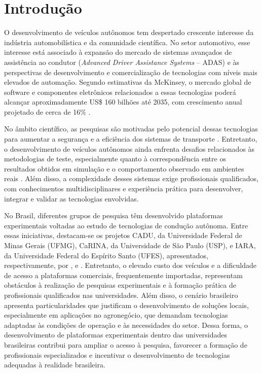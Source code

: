 \section{Introdução}
\label{sec:introducao}

O desenvolvimento de veículos autônomos tem despertado crescente interesse da indústria automobilística e da comunidade científica. No setor automotivo, esse interesse está associado à expansão do mercado de sistemas avançados de assistência ao condutor (\textit{Advanced Driver Assistance Systems} -- ADAS) e às perspectivas de desenvolvimento e comercialização de tecnologias com níveis mais elevados de automação. Segundo estimativas da McKinsey, o mercado global de software e componentes eletrônicos relacionados a essas tecnologias poderá alcançar aproximadamente US\$ 160 bilhões até 2035, com crescimento anual projetado de cerca de 16\% \citep{McKinsey2026}.

No âmbito científico, as pesquisas são motivadas pelo potencial dessas tecnologias para aumentar a segurança e a eficiência dos sistemas de transporte \citep{Badue2021,Zhao2024}. Entretanto, o desenvolvimento de veículos autônomos ainda enfrenta desafios relacionados às metodologias de teste, especialmente quanto à correspondência entre os resultados obtidos em simulação e o comportamento observado em ambientes reais \citep{Liao2025}. Além disso, a complexidade desses sistemas exige profissionais qualificados, com conhecimentos multidisciplinares e experiência prática para desenvolver, integrar e validar as tecnologias envolvidas.

No Brasil, diferentes grupos de pesquisa têm desenvolvido plataformas experimentais voltadas ao estudo de tecnologias de condução autônoma. Entre essas iniciativas, destacam-se os projetos CADU, da Universidade Federal de Minas Gerais (UFMG), CaRINA, da Universidade de São Paulo (USP), e IARA, da Universidade Federal do Espírito Santo (UFES), apresentados, respectivamente, por \cite{Sabbagh2010}, \cite{Fernandes2014} e \cite{Badue2021}. Entretanto, o elevado custo dos veículos e a dificuldade de acesso a plataformas comerciais, frequentemente importadas, representam obstáculos à realização de pesquisas experimentais e à formação prática de profissionais qualificados nas universidades. Além disso, o cenário brasileiro apresenta particularidades que justificam o desenvolvimento de soluções locais, especialmente em aplicações no agronegócio, que demandam tecnologias adaptadas às condições de operação e às necessidades do setor. Dessa forma, o desenvolvimento de plataformas experimentais dentro das universidades brasileiras contribui para ampliar o acesso à pesquisa, favorecer a formação de profissionais especializados e incentivar o desenvolvimento de tecnologias adequadas à realidade brasileira.

